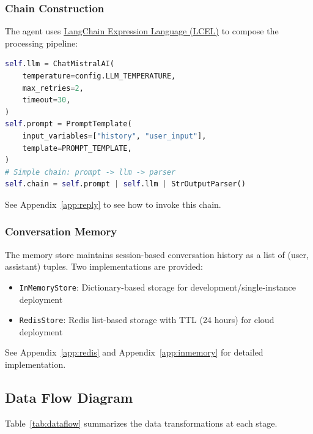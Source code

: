 \documentclass[a4paper]{article}
\begin{document}
\subsubsection{Chain Construction}

The agent uses \href{https://blog.langchain.com/langchain-expression-language/}{LangChain Expression Language (LCEL)} to compose the processing pipeline:

\begin{lstlisting}[language=Python, caption={LangChain chain construction}, label=lst:chain]
self.llm = ChatMistralAI(
    temperature=config.LLM_TEMPERATURE,
    max_retries=2,
    timeout=30,
)
self.prompt = PromptTemplate(
    input_variables=["history", "user_input"],
    template=PROMPT_TEMPLATE,
)
# Simple chain: prompt -> llm -> parser
self.chain = self.prompt | self.llm | StrOutputParser()
\end{lstlisting}
See Appendix~\ref{app:reply} to see how to invoke this chain.

\subsubsection{Conversation Memory}

The memory store maintains session-based conversation history as a list of (user, assistant) tuples. Two implementations are provided:

\begin{itemize}[noitemsep]
    \item \texttt{InMemoryStore}: Dictionary-based storage for development/single-instance deployment
    \item \texttt{RedisStore}: Redis list-based storage with TTL (24 hours) for cloud deployment
\end{itemize}
See Appendix~\ref{app:redis} and Appendix~\ref{app:inmemory} for detailed implementation.

\subsection{Data Flow Diagram}

Table~\ref{tab:dataflow} summarizes the data transformations at each stage.
\end{document}
